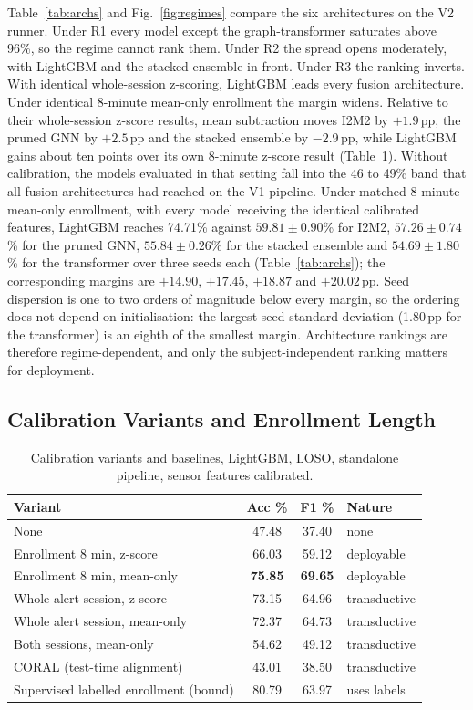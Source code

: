 \documentclass[journal]{IEEEtran}
\newcommand{\pp}{\,pp}
\newcommand{\rone}{R1}
\newcommand{\rtwo}{R2}
\newcommand{\rthree}{R3}
\begin{document}
Table~\ref{tab:archs} and Fig.~\ref{fig:regimes} compare the six
architectures on the V2 runner. Under \rone{} every model except the
graph-transformer saturates above 96\%, so the regime cannot rank them. Under
\rtwo{} the spread opens moderately, with LightGBM and the stacked ensemble in
front. Under \rthree{} the ranking inverts. With identical whole-session
z-scoring, LightGBM leads every fusion architecture. Under identical 8-minute
mean-only enrollment the margin widens. Relative to their whole-session
z-score results, mean subtraction moves I2M2 by $+1.9$\pp, the pruned GNN by
$+2.5$\pp{} and the stacked ensemble by $-2.9$\pp, while LightGBM gains about
ten points over its own 8-minute z-score result (Table~\ref{tab:variants}).
Without calibration, the models evaluated in that setting fall into the 46 to
49\% band that all fusion architectures had reached on the V1 pipeline.
Under matched 8-minute mean-only enrollment, with every model receiving the
identical calibrated features, LightGBM reaches 74.71\% against $59.81 \pm 0.90$\%
for I2M2, $57.26 \pm 0.74$\% for the pruned GNN, $55.84 \pm 0.26$\% for the
stacked ensemble and $54.69 \pm 1.80$\% for the transformer over three seeds each
(Table~\ref{tab:archs}); the corresponding margins are $+14.90$, $+17.45$,
$+18.87$ and $+20.02$\pp{}. Seed dispersion is one to two orders of magnitude
below every margin, so the ordering does not depend on initialisation: the largest
seed standard deviation (1.80\pp{} for the transformer) is an eighth of the
smallest margin. Architecture rankings are therefore regime-dependent,
and only the subject-independent ranking matters for deployment.

\subsection{Calibration Variants and Enrollment Length}
\label{sec:variants}
\begin{table}[!t]
\caption{Calibration variants and baselines, LightGBM, LOSO, standalone
pipeline, sensor features calibrated.}
\label{tab:variants}
\centering\footnotesize
\begin{tabular}{@{}lccl@{}}
\toprule
Variant & Acc \% & F1 \% & Nature \\
\midrule
None                              & 47.48 & 37.40 & none \\
Enrollment 8 min, z-score         & 66.03 & 59.12 & deployable \\
Enrollment 8 min, mean-only       & \textbf{75.85} & \textbf{69.65} & deployable \\
Whole alert session, z-score      & 73.15 & 64.96 & transductive \\
Whole alert session, mean-only    & 72.37 & 64.73 & transductive \\
Both sessions, mean-only          & 54.62 & 49.12 & transductive \\
CORAL (test-time alignment)~\cite{sun2016coral} & 43.01 & 38.50 & transductive \\
Supervised labelled enrollment (bound) & 80.79 & 63.97 & uses labels \\
\bottomrule
\end{tabular}
\end{table}
\end{document}
